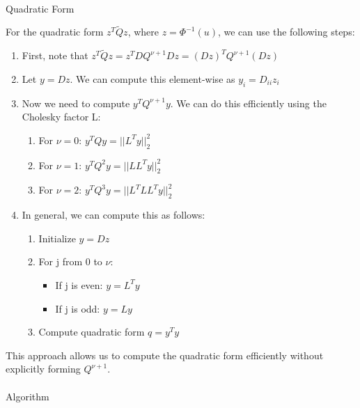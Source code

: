 \documentclass[journal=,manuscript=]{achemso}
\makeatletter
\let\oldparagraph\paragraph
\renewcommand{\paragraph}{
    \@ifstar
      \xxxParagraphStar
      \xxxParagraphNoStar
  }
\newcommand{\xxxParagraphStar}[1]{\oldparagraph*{#1}\mbox{}}
\newcommand{\xxxParagraphNoStar}[1]{\oldparagraph{#1}\mbox{}}
\providecommand{\tightlist}{%
  \setlength{\itemsep}{0pt}\setlength{\parskip}{0pt}}\usepackage{longtable,booktabs,array}
\makeatother
\begin{document}
\paragraph{Quadratic Form}\label{quadratic-form}

For the quadratic form \(z^T\tilde{Q}z\), where \(z = \Phi^{-1}(u)\), we
can use the following steps:

\begin{enumerate}
\def\labelenumi{\arabic{enumi}.}
\tightlist
\item
  First, note that
  \(z^T\tilde{Q}z = z^TDQ^{\nu+1}Dz = (Dz)^TQ^{\nu+1}(Dz)\)
\item
  Let \(y = Dz\). We can compute this element-wise as
  \(y_i = D_{ii}z_i\)
\item
  Now we need to compute \(y^TQ^{\nu+1}y\). We can do this efficiently
  using the Cholesky factor L:

  \begin{enumerate}
  \def\labelenumii{\roman{enumii}.}
  \tightlist
  \item
    For \(\nu = 0\): \(y^TQy = ||L^Ty||_2^2\)
  \item
    For \(\nu = 1\): \(y^TQ^2y = ||LL^Ty||_2^2\)
  \item
    For \(\nu = 2\): \(y^TQ^3y = ||L^TLL^Ty||_2^2\)
  \end{enumerate}
\item
  In general, we can compute this as follows:

  \begin{enumerate}
  \def\labelenumii{\roman{enumii})}
  \tightlist
  \item
    Initialize \(y = Dz\)
  \item
    For j from 0 to \(\nu\):

    \begin{itemize}
    \tightlist
    \item
      If j is even: \(y = L^Ty\)
    \item
      If j is odd: \(y = Ly\)
    \end{itemize}
  \item
    Compute quadratic form \(q = y^Ty\)
  \end{enumerate}
\end{enumerate}

This approach allows us to compute the quadratic form efficiently
without explicitly forming \(Q^{\nu+1}\).

\paragraph{Algorithm}\label{algorithm-1}
\end{document}
